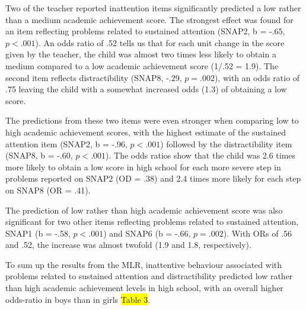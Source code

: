 \documentclass[10pt,letterpaper]{article}
\begin{document}
Two of the teacher reported inattention items significantly predicted a low rather than a medium academic achievement score. The strongest effect was found for an item reflecting problems related to sustained attention (SNAP2, b = -.65, $p < .001$). An odds ratio of .52 tells us that for each unit change in the score given by the teacher, the child was almost two times less likely to obtain a medium compared to a low academic achievement score (1/.52 = 1.9). The second item reflects distractibility (SNAP8, -.29, $p = .002$), with an odds ratio of .75 leaving the child with a somewhat increased odds (1.3) of obtaining a low score.  


The predictions from these two items were even stronger when comparing low to high academic achievement scores, with the highest estimate of the sustained attention item (SNAP2, b = -.96, $p < .001$) followed by the distractibility item (SNAP8, b = -.60, $p < .001$).  The odds ratios show that the child was 2.6 times more likely to obtain a low score in high school for each more severe step in problems reported on SNAP2 (OD = .38) and  2.4 times more likely for each step on SNAP8 (OR = .41).  

The prediction of low rather than high academic achievement score was also significant for two other items reflecting problems related to sustained attention, SNAP1 (b = -.58, $p < .001$) and SNAP6 (b = -.66, $p = .002$). With ORs of .56 and .52, the increase was almost twofold (1.9 and 1.8, respectively). 





To sum up the results from the MLR, inattentive behaviour associated with problems related to sustained attention and distractibility predicted low rather than high academic achievement levels in high school, with an overall higher odds-ratio in boys than in girls \colorbox{yellow}{Table 3}. \\
\end{document}
